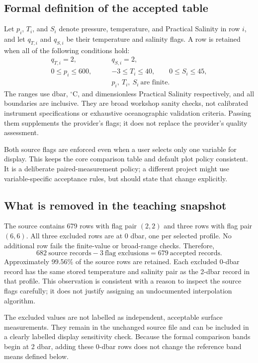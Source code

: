 \documentclass[11pt,letterpaper]{article}
\newcommand{\degC}{\ensuremath{{}^{\circ}\mathrm{C}}}
\begin{document}
\subsection{Formal definition of the accepted table}
Let $p_i$, $T_i$, and $S_i$ denote pressure, temperature, and Practical Salinity in row $i$, and let $q_{T,i}$ and $q_{S,i}$ be their temperature and salinity flags. A row is retained when all of the following conditions hold:
\begin{align}
q_{T,i}=2,\qquad &q_{S,i}=2, \label{eq:flags}\\
0\leq p_i\leq600,\qquad &-3\leq T_i\leq40,\qquad 0\leq S_i\leq45, \label{eq:ranges}\\
&p_i,\ T_i,\ S_i\ \text{are finite}. \label{eq:finite}
\end{align}
The ranges use dbar, \degC, and dimensionless Practical Salinity respectively, and all boundaries are inclusive. They are broad workshop sanity checks, not calibrated instrument specifications or exhaustive oceanographic validation criteria. Passing them supplements the provider's flags; it does not replace the provider's quality assessment.

Both source flags are enforced even when a user selects only one variable for display. This keeps the core comparison table and default plot policy consistent. It is a deliberate paired-measurement policy; a different project might use variable-specific acceptance rules, but should state that change explicitly.

\subsection{What is removed in the teaching snapshot}
The source contains 679 rows with flag pair $(2,2)$ and three rows with flag pair $(6,6)$. All three excluded rows are at 0 dbar, one per selected profile. No additional row fails the finite-value or broad-range checks. Therefore,
\[
682\ \text{source records} - 3\ \text{flag exclusions}
=679\ \text{accepted records}.
\]
Approximately 99.56\% of the source rows are retained. Each excluded 0-dbar record has the same stored temperature and salinity pair as the 2-dbar record in that profile. This observation is consistent with a reason to inspect the source flags carefully; it does not justify assigning an undocumented interpolation algorithm.

The excluded values are not labelled as independent, acceptable surface measurements. They remain in the unchanged source file and can be included in a clearly labelled display sensitivity check. Because the formal comparison bands begin at 2 dbar, adding these 0-dbar rows does not change the reference band means defined below.
\end{document}
